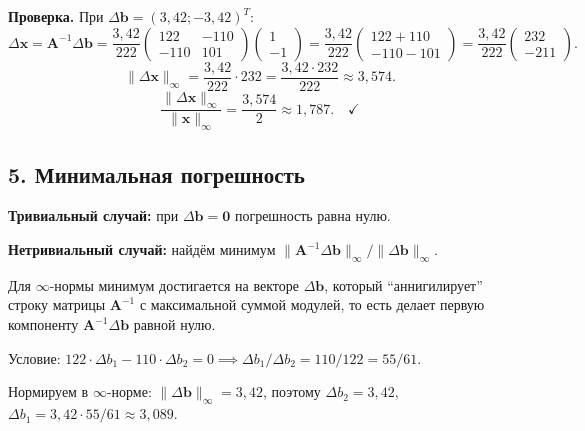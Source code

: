 \documentclass{article}
\begin{document}
\textbf{Проверка.} При $\Delta\mathbf{b} = (3{,}42; -3{,}42)^T$:
\begin{equation}
\Delta\mathbf{x} = \mathbf{A}^{-1}\Delta\mathbf{b} = \frac{3{,}42}{222} \begin{pmatrix} 122 & -110 \\ -110 & 101 \end{pmatrix} \begin{pmatrix} 1 \\ -1 \end{pmatrix} = \frac{3{,}42}{222} \begin{pmatrix} 122 + 110 \\ -110 - 101 \end{pmatrix} = \frac{3{,}42}{222} \begin{pmatrix} 232 \\ -211 \end{pmatrix}.
\end{equation}
\begin{equation}
\|\Delta\mathbf{x}\|_\infty = \frac{3{,}42}{222} \cdot 232 = \frac{3{,}42 \cdot 232}{222} \approx 3{,}574.
\end{equation}
\begin{equation}
\frac{\|\Delta\mathbf{x}\|_\infty}{\|\mathbf{x}\|_\infty} = \frac{3{,}574}{2} \approx 1{,}787. \quad \checkmark
\end{equation}

\subsection*{5. Минимальная погрешность}

\textbf{Тривиальный случай:} при $\Delta\mathbf{b} = \mathbf{0}$ погрешность равна нулю.

\textbf{Нетривиальный случай:} найдём минимум $\|\mathbf{A}^{-1}\Delta\mathbf{b}\|_\infty / \|\Delta\mathbf{b}\|_\infty$.

Для $\infty$-нормы минимум достигается на векторе $\Delta\mathbf{b}$, который ``аннигилирует'' строку матрицы $\mathbf{A}^{-1}$ с максимальной суммой модулей, то есть делает первую компоненту $\mathbf{A}^{-1}\Delta\mathbf{b}$ равной нулю.

Условие: $122 \cdot \Delta b_1 - 110 \cdot \Delta b_2 = 0 \implies \Delta b_1 / \Delta b_2 = 110/122 = 55/61$.

Нормируем в $\infty$-норме: $\|\Delta\mathbf{b}\|_\infty = 3{,}42$, поэтому $\Delta b_2 = 3{,}42$, $\Delta b_1 = 3{,}42 \cdot 55/61 \approx 3{,}089$.
\end{document}
